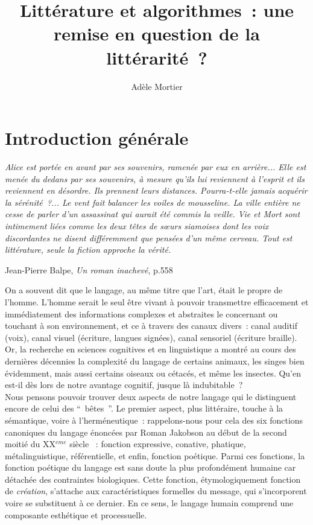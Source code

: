 \documentclass{article}
\title{Littérature et algorithmes~: une remise en question de la littérarité~?}
\author{Adèle Mortier}
\begin{document}
	\nocite{*}
	\maketitle
	\tableofcontents
	\newpage
	\section*{Introduction générale}
	\begin{center}
		\begin{minipage}{.8\textwidth}
			\textit{Alice est portée en avant par ses souvenirs, ramenée par eux en arrière... Elle est menée du dedans par ses souvenirs, à mesure qu'ils lui reviennent à l'esprit et ils reviennent en désordre. Ils prennent leurs distances. Pourra-t-elle jamais acquérir la sérénité~?... Le vent fait balancer les voiles de mousseline. La ville entière ne cesse de parler d'un assassinat qui aurait été commis la veille. Vie et Mort sont intimement liées comme les deux têtes de sœurs siamoises dont les voix discordantes ne disent différemment que pensées d'un même cerveau. Tout est littérature, seule la fiction approche la vérité.}
			\begin{flushright}
				Jean-Pierre Balpe, \textit{Un roman inachevé}, p.558 \cite{balpe1994}
			\end{flushright}
		\end{minipage}
	\end{center}
	
		On a souvent dit que le langage, au même titre que l'art, était le propre de l'homme. L'homme serait le seul être vivant à pouvoir transmettre efficacement et immédiatement des informations complexes et abstraites le concernant ou touchant à son environnement, et ce à travers des canaux divers~: canal auditif (voix), canal visuel (écriture, langues signées), canal sensoriel (écriture braille). Or, la recherche en sciences cognitives et  en linguistique a montré au cours des dernières décennies la complexité du langage de certains animaux, les singes bien évidemment\cite{schlenker2014}, mais aussi certains oiseaux ou cétacés\cite{dehaene2017}, et même les insectes. Qu'en est-il dès lors de notre avantage cognitif, jusque là indubitable~?\\
		
		Nous pensons pouvoir trouver deux aspects de notre langage qui le distinguent encore de celui des `` bêtes ''. Le premier aspect, plus littéraire, touche à la sémantique, voire à l'herméneutique~: rappelons-nous pour cela des six fonctions canoniques du langage énoncées par Roman Jakobson au début de la second moitié du XX$^{eme}$ siècle \cite{jakobson1960}~: fonction expressive, conative, phatique, métalinguistique, référentielle, et enfin, fonction poétique. Parmi ces fonctions, la fonction poétique du langage est sans doute la plus profondément humaine car détachée des contraintes biologiques. Cette fonction, étymologiquement fonction de \textit{création}, s'attache aux caractéristiques formelles du message, qui s'incorporent voire se substituent à ce dernier. En ce sens, le langage humain comprend une composante esthétique et processuelle.\\
		
\end{document}
